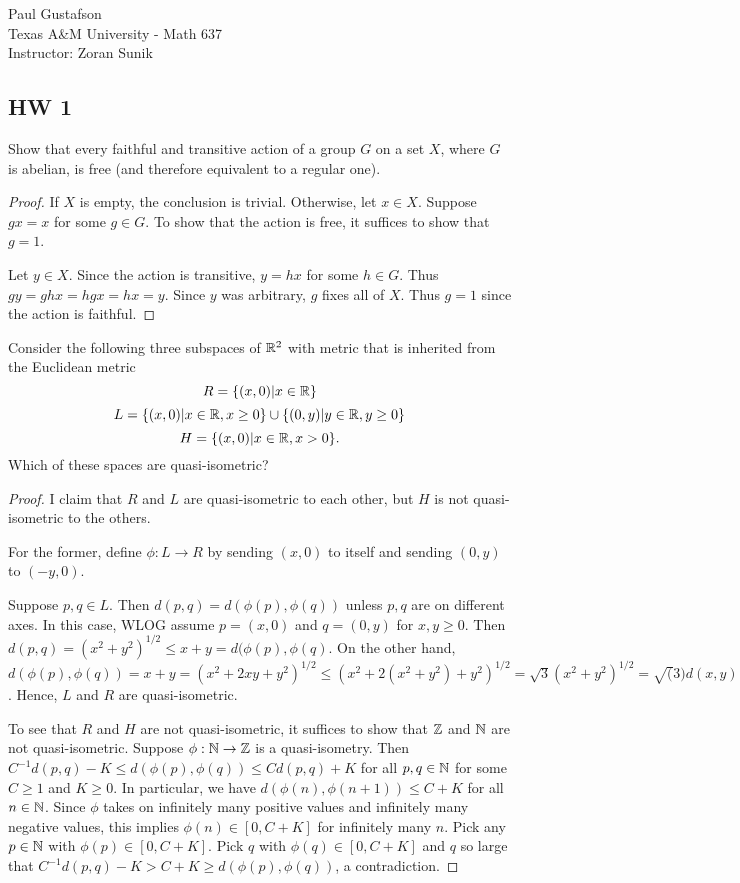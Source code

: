 \documentclass{article}
\begin{document}
\noindent Paul Gustafson\\
\noindent Texas A\&M University - Math 637\\ 
\noindent Instructor: Zoran Sunik

\subsection*{HW 1}
  Show that every faithful and transitive action of a group $G$ on a set $X$, where $G$ is abelian, is free (and therefore equivalent to a regular one).
\begin{proof} 
If $X$ is empty, the conclusion is trivial.  Otherwise, let $x \in X$.  Suppose $gx = x$ for some $g \in G$.  To show that the action is free, it suffices to show that $g = 1$.

Let $y \in X$.  Since the action is transitive, $y = hx$ for some $h \in G$.  Thus $gy = ghx = hgx = hx = y$.  Since $y$ was arbitrary, $g$ fixes all of $X$.  Thus $g = 1$ since the action is faithful.
\end{proof}

 Consider the following three subspaces of $\mathbb{R}^2$ with metric that is inherited from the Euclidean metric
$$
R = \{ (x,0) | x \in \mathbb{R} \}
$$
$$
L = \{ (x,0) | x \in \mathbb{R}, x \ge 0\} \cup \{(0,y) | y \in \mathbb{R}, y \ge 0 \}
$$
$$
H = \{ (x, 0) | x \in \mathbb{R}, x > 0 \}.
$$
Which of these spaces are quasi-isometric?
\begin{proof}
I claim that $R$ and $L$ are quasi-isometric to each other, but $H$ is not quasi-isometric to the others.

For the former, define $\phi: L \to R$ by sending $(x,0)$ to itself and sending $(0,y)$ to $(-y,0)$.

Suppose $p,q \in L$.  Then $d(p,q) = d(\phi(p), \phi(q))$ unless $p,q$ are on different axes.
In this case, WLOG assume $p = (x,0)$ and $q = (0,y)$ for $x,y \ge 0$.  Then $d(p,q) = (x^2 + y^2)^{1/2} \le x + y = d(\phi(p), \phi(q)$.
On the other hand, $d(\phi(p), \phi(q)) = x + y = (x^2 + 2xy + y^2)^{1/2} \le (x^2 + 2(x^2 + y^2) + y^2)^{1/2} =  \sqrt{3} (x^2 + y^2)^{1/2} = \sqrt(3) d(x,y)$.
Hence, $L$ and $R$ are quasi-isometric.

To see that $R$ and $H$ are not quasi-isometric, it suffices to show that $\mathbb{Z}$ and $\mathbb{N}$ are not quasi-isometric. Suppose $\phi: \mathbb{N} \to \mathbb{Z}$ is a quasi-isometry. Then $C^{-1} d(p,q) - K \le d(\phi(p), \phi(q)) \le C d(p,q) + K$ for all $p,q \in \mathbb{N}$ for some $C \ge 1$ and $K \ge 0$.  In particular, we have $d(\phi(n), \phi(n+1)) \le C + K$ for all $n \in \mathbb{N}$. Since $\phi$ takes on infinitely many positive values and infinitely many negative values, this implies $\phi(n) \in [0, C+K]$ for infinitely many $n$. Pick any $p \in \mathbb{N}$ with $\phi(p) \in [0, C+K]$.  Pick $q$ with $\phi(q) \in [0, C+K]$ and $q$ so large that $C^{-1} d(p,q) - K > C+K  \ge d(\phi(p), \phi(q))$, a contradiction.
\end{proof}
\end{document}
